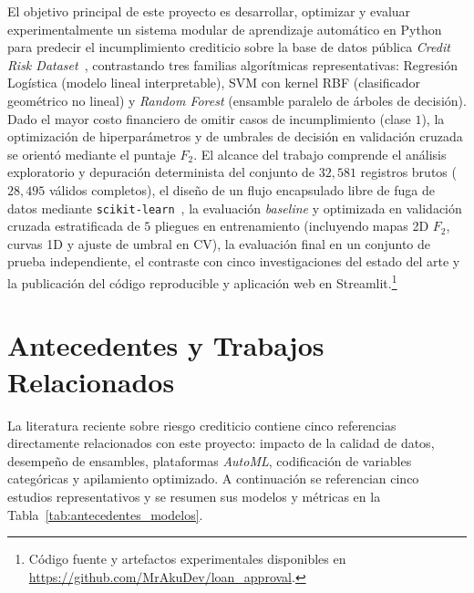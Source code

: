 \documentclass[conference]{IEEEtran}
\begin{document}
El objetivo principal de este proyecto es desarrollar, optimizar y evaluar experimentalmente un sistema modular de aprendizaje automático en Python para predecir el incumplimiento crediticio sobre la base de datos pública \textit{Credit Risk Dataset}~\cite{laotse_credit_risk}, contrastando tres familias algorítmicas representativas: Regresión Logística (modelo lineal interpretable), SVM con kernel RBF (clasificador geométrico no lineal) y \textit{Random Forest} (ensamble paralelo de árboles de decisión). Dado el mayor costo financiero de omitir casos de incumplimiento (clase $1$), la optimización de hiperparámetros y de umbrales de decisión en validación cruzada se orientó mediante el puntaje $F_2$. El alcance del trabajo comprende el análisis exploratorio y depuración determinista del conjunto de $32{,}581$ registros brutos ($28{,}495$ válidos completos), el diseño de un flujo encapsulado libre de fuga de datos mediante \texttt{scikit-learn}~\cite{pedregosa2011scikit}, la evaluación \textit{baseline} y optimizada en validación cruzada estratificada de $5$ pliegues en entrenamiento (incluyendo mapas 2D $F_2$, curvas 1D y ajuste de umbral en CV), la evaluación final en un conjunto de prueba independiente, el contraste con cinco investigaciones del estado del arte y la publicación del código reproducible y aplicación web en Streamlit.\footnote{Código fuente y artefactos experimentales disponibles en \url{https://github.com/MrAkuDev/loan_approval}.}

\section{Antecedentes y Trabajos Relacionados}

La literatura reciente sobre riesgo crediticio contiene cinco referencias directamente relacionados con este proyecto: impacto de la calidad de datos, desempeño de ensambles, plataformas \textit{AutoML}, codificación de variables categóricas y apilamiento optimizado. A continuación se referencian cinco estudios representativos y se resumen sus modelos y métricas en la Tabla~\ref{tab:antecedentes_modelos}.
\end{document}
